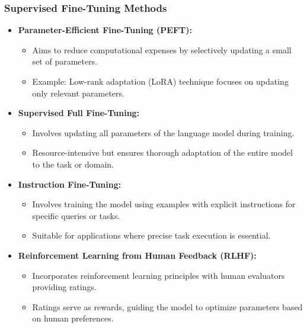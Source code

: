 \begin{frame}[fragile]\frametitle{Supervised Fine-Tuning Methods}

\begin{itemize}
\item \textbf{Parameter-Efficient Fine-Tuning (PEFT):}
  \begin{itemize}
	\item Aims to reduce computational expenses by selectively updating a small set of parameters.
	\item Example: Low-rank adaptation (LoRA) technique focuses on updating only relevant parameters.
  \end{itemize}
\item \textbf{Supervised Full Fine-Tuning:}
  \begin{itemize}
	\item Involves updating all parameters of the language model during training.
	\item Resource-intensive but ensures thorough adaptation of the entire model to the task or domain.
  \end{itemize}
\item \textbf{Instruction Fine-Tuning:}
  \begin{itemize}
	\item Involves training the model using examples with explicit instructions for specific queries or tasks.
	\item Suitable for applications where precise task execution is essential.
  \end{itemize}
\item \textbf{Reinforcement Learning from Human Feedback (RLHF):}
  \begin{itemize}
	\item Incorporates reinforcement learning principles with human evaluators providing ratings.
	\item Ratings serve as rewards, guiding the model to optimize parameters based on human preferences.
  \end{itemize}
\end{itemize}

\end{frame}

